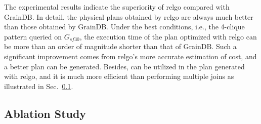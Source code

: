 The experimental results indicate the superiority of relgo compared with GrainDB.
In detail, the physical plans obtained by relgo are always much better than those obtained by GrainDB.
Under the best conditions, i.e., the 4-clique pattern queried on $G_{sf30}$, the execution time of the plan optimized with relgo can be more than an order of magnitude shorter than that of GrainDB.
Such a significant improvement comes from relgo's more accurate estimation of cost, and a better plan can be generated.
Besides, \expandintersectrule can be utilized in the plan generated with relgo, and it is much more efficient than performing multiple joins as illustrated in Sec.~\ref{sec:experiment-ablation}.



\subsection{Ablation Study}
\label{sec:experiment-ablation}

